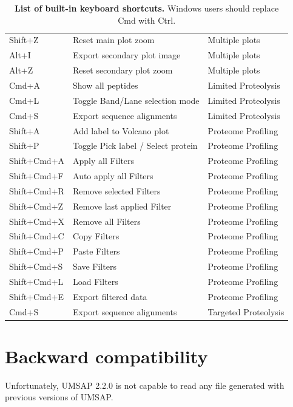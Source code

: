 \begin{table}[h!]
\begin{tabular}{l l l}
        Shift+Z    &Reset main plot zoom               &Multiple plots\\
        Alt+I      &Export secondary plot image        &Multiple plots\\
        Alt+Z      &Reset secondary plot zoom          &Multiple plots\\
        Cmd+A      &Show all peptides                  &Limited Proteolysis\\
        Cmd+L      &Toggle Band/Lane selection mode    &Limited Proteolysis\\
        Cmd+S      &Export sequence alignments         &Limited Proteolysis\\
        Shift+A    &Add label to Volcano plot          &Proteome Profiling\\
        Shift+P    &Toggle Pick label / Select protein &Proteome Profiling\\
        Shift+Cmd+A&Apply all Filters                  &Proteome Profiling\\
        Shift+Cmd+F&Auto apply all Filters             &Proteome Profiling\\
        Shift+Cmd+R&Remove selected Filters            &Proteome Profiling\\
        Shift+Cmd+Z&Remove last applied Filter         &Proteome Profiling\\
        Shift+Cmd+X&Remove all Filters                 &Proteome Profiling\\
        Shift+Cmd+C&Copy Filters                       &Proteome Profiling\\
        Shift+Cmd+P&Paste Filters                      &Proteome Profiling\\
        Shift+Cmd+S&Save Filters                       &Proteome Profiling\\
        Shift+Cmd+L&Load Filters                       &Proteome Profiling\\
        Shift+Cmd+E&Export filtered data               &Proteome Profiling\\
        Cmd+S      &Export sequence alignments         &Targeted Proteolysis\\
        \hline		
    \end{tabular}
    \caption[List of built-in keyboard shortcuts]{\textbf{List of built-in keyboard
    shortcuts.} Windows users should replace Cmd with Ctrl.}
    \label{table:shortcuts}
\end{table}

\section{Backward compatibility}
\label{sec:backwardCompatibility}

Unfortunately, UMSAP 2.2.0 is not capable to read any file generated with previous
versions of UMSAP.